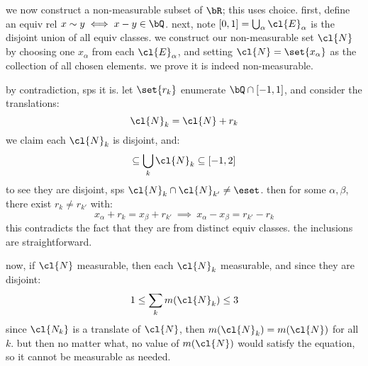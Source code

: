 we now construct a non-measurable subset of $\bR$; this uses choice.
first, define an equiv rel $x\sim y \iff x-y\in\bQ$.
next, note $[0,1] = \bigcup_{\alpha}\cl{E}_{\alpha}$ is the disjoint union of
all equiv classes.
we construct our non-measurable set $\cl{N}$ by choosing one $x_{\alpha}$ from
each $\cl{E}_{\alpha}$,
and setting $\cl{N}=\set{x_{\alpha}}$ as the collection of all chosen elements.
we prove it is indeed non-measurable.

by contradiction, sps it is.
let $\set{r_{k}}$ enumerate $\bQ\cap[-1,1]$, and consider the translations:
\begin{equation*}
    \cl{N}_{k} = \cl{N}+r_{k}
\end{equation*}
we claim each $\cl{N}_{k}$ is disjoint, and:
\begin{equation*}
    [0,1]\subseteq\bigcup_{k}\cl{N}_{k}\subseteq[-1,2]
\end{equation*}
to see they are disjoint, sps $\cl{N}_{k}\cap\cl{N}_{k'}\neq\eset$.
then for some $\alpha,\beta$, there exist $r_{k}\neq r_{k'}$ with:
\begin{equation*}
    x_{\alpha}+r_{k} = x_{\beta}+r_{k'} \ \implies \
    x_{\alpha}-x_{\beta}=r_{k'}-r_{k}
\end{equation*}
this contradicts the fact that they are from distinct equiv classes.
the inclusions are straightforward.

now, if $\cl{N}$ measurable, then each $\cl{N}_{k}$ measurable, and since they
are disjoint:
\begin{equation*}
    1\leq\sum_{k}m(\cl{N}_{k})\leq3
\end{equation*}
since $\cl{N_{k}}$ is a translate of $\cl{N}$, then $m(\cl{N}_{k})=m(\cl{N})$
for all $k$.
but then no matter what, no value of $m(\cl{N})$ would satisfy the equation, so
it cannot be measurable as needed.

